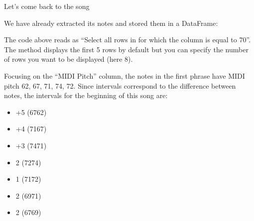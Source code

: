 \documentclass[letterpaper,10pt,english]{sphinxmanual}
\begin{document}
Let’s come back to the song 

{
\begin{sphinxVerbatim}[commandchars=\\\{\}]
\llap{\color{nbsphinxin}[ ]:\,\hspace{\fboxrule}\hspace{\fboxsep}}
\end{sphinxVerbatim}
}

We have already extracted its notes and stored them in a DataFrame:

{
\begin{sphinxVerbatim}[commandchars=\\\{\}]
\llap{\color{nbsphinxin}[ ]:\,\hspace{\fboxrule}\hspace{\fboxsep}}\PYG{p}{[}\PYG{p}{[}\PYG{p}{]}  \PYG{p}{]}
\end{sphinxVerbatim}
}

The code above reads as “Select all rows in  for which the column  is equal to 70”. The  method displays the first 5 rows by default but you can specify the number of rows you want to be displayed (here 8).

Focusing on the “MIDI Pitch” column, the notes in the first phrase have MIDI pitch 62, 67, 71, 74, 72. Since intervals correspond to the difference between notes, the intervals for the beginning of this song are:
\begin{itemize}
\item {} 
+5 (67\sphinxhyphen{}62)

\item {} 
+4 (71\sphinxhyphen{}67)

\item {} 
+3 (74\sphinxhyphen{}71)

\item {} 
\sphinxhyphen{}2 (72\sphinxhyphen{}74)

\item {} 
\sphinxhyphen{}1 (71\sphinxhyphen{}72)

\item {} 
\sphinxhyphen{}2 (69\sphinxhyphen{}71)

\item {} 
\sphinxhyphen{}2 (67\sphinxhyphen{}69)

\end{itemize}
\end{document}
